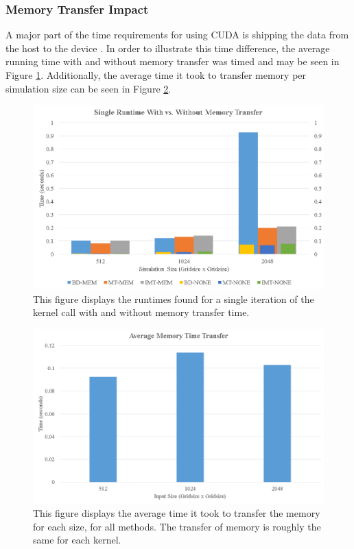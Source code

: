 \subsubsection{Memory Transfer Impact}
A major part of the time requirements for using CUDA is shipping the data from the host to the device \cite{cudabyexample}. In order to illustrate this time difference, the average running time with and without memory transfer was timed and may be seen in Figure \ref{fig:mem_comp}. Additionally, the average time it took to transfer memory per simulation size can be seen in Figure \ref{fig:mem_trans}. 
\begin{figure}%
\centering
  \includegraphics[width=\textwidth]{figures/results/mem_compare.png}
  \caption{This figure displays the runtimes found for a single iteration of the kernel call with and without memory transfer time.}
  \label{fig:mem_comp}
\end{figure} 
\begin{figure}%
\centering
  \includegraphics[width=\textwidth]{figures/results/memory_transfer.png}
  \caption{This figure displays the average time it took to transfer the memory for each size, for all methods. The transfer of memory is roughly the same for each kernel.}
  \label{fig:mem_trans}
\end{figure} 


